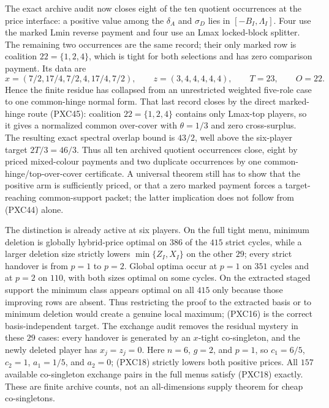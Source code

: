 \documentclass[11pt]{article}
\begin{document}
The exact archive audit now closes eight of the ten quotient occurrences at
the price interface: a positive value among the $\delta_A$ and $\sigma_D$
lies in $[-B_I,\Lambda_I]$.  Four use the marked Lmin reverse payment and
four use an Lmax locked-block splitter.  The remaining two occurrences are
the same record; their only marked row is coalition $22=\{1,2,4\}$, which is
tight for both selections and has zero comparison payment.  Its data are
\[
 x=(7/2,17/4,7/2,4,17/4,7/2),\qquad
 z=(3,4,4,4,4,4),\qquad T=23,\qquad O=22.
\]
Hence the finite residue has collapsed from an unrestricted weighted
five-role case to one common-hinge normal form.  That last record closes by
the direct marked-hinge route (PXC45): coalition $22=\{1,2,4\}$ contains
only Lmax-top players, so it gives a normalized common over-cover with
$\theta=1/3$ and zero cross-surplus.  The resulting exact spectral overlap
bound is $43/2$, well above the six-player target $2T/3=46/3$.  Thus all ten
archived quotient occurrences close, eight by priced mixed-colour payments
and two duplicate occurrences by one common-hinge/top-over-cover certificate.
A universal theorem still has to show that the positive arm is sufficiently
priced, or that a zero marked payment forces a target-reaching common-support
packet; the latter implication does not follow from (PXC44) alone.

The distinction is already active at six players.  On the full tight menu,
minimum deletion is globally hybrid-price optimal on $386$ of the $415$
strict cycles, while a larger deletion size strictly lowers
$\min\{Z_I,X_I\}$ on the other $29$; every strict handover is from $p=1$ to
$p=2$.  Global optima occur at $p=1$ on $351$ cycles and at $p=2$ on $110$,
with both sizes optimal on some cycles.  On the extracted staged support the
minimum class appears optimal on all $415$ only because those improving rows
are absent.  Thus restricting the proof to the extracted basis or to minimum
deletion would create a genuine local maximum; (PXC16) is the correct
basis-independent target.  The exchange audit removes the residual mystery
in these $29$ cases: every handover is generated by an $x$-tight
co-singleton, and the newly deleted player has $x_j=z_j=0$.  Here $n=6$,
$g=2$, and $p=1$, so $c_1=6/5$, $c_2=1$, $a_1=1/5$, and $a_2=0$; (PXC18)
strictly lowers both positive prices.  All $157$ available co-singleton
exchange pairs in the full menus satisfy (PXC18) exactly.  These are finite
archive counts, not an all-dimensions supply theorem for cheap
co-singletons.
\end{document}
